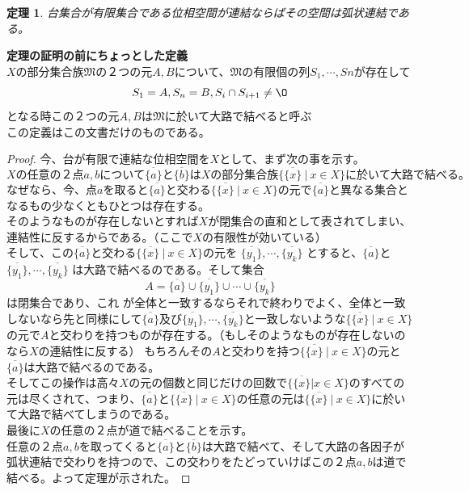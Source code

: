 \documentclass[leqno]{jsarticle}
\newtheorem{thm}{定理}
\begin{document}
\begin{thm}
台集合が有限集合である位相空間が連結ならばその空間は弧状連結である。
\end{thm}
{\bf 定理の証明の前にちょっとした定義}\\
$X$の部分集合族$\mathfrak{M}$の２つの元$A,B$について、$\mathfrak{M}$の有限個の列$S_{1},\cdots,S{n}$が存在して\[S_{1}=A,S_{n}=B,S_{i}\cap S_{i+1}\neq\O\]となる時この２つの元$A,B$は$\mathfrak{M}$に於いて大路で結べると呼ぶ\\
この定義はこの文書だけのものである。
\begin{proof}
今、台が有限で連結な位相空間を$X$として、まず次の事を示す。
\[
Xの任意の２点a,bについて\overline{\{a\}}と\overline{\{b\}}はXの部分集合族
\{\overline{\{x\}}\ |\ x\in{X}\}に於いて大路で結べる。
\]
なぜなら、今、点$a$を取ると$\overline{\{a\}}$と交わる$\{\overline{\{x\}}\ |\ x\in{X}\}$の元で$\overline{\{a\}}$と異なる集合となるもの少なくともひとつは存在する。\\
そのようなものが存在しないとすれば$X$が閉集合の直和として表されてしまい、連結性に反するからである。（ここで$X$の有限性が効いている）\\
そして、この$\overline{\{a\}}$と交わる$\{\overline{\{x\}}\ |\ x\in{X}\}$の元を
$\overline{\{y_{1}\}},\cdots,\overline{\{y_{k}\}}$
とすると、$\overline{\{a\}}$と
$\overline{\{y_{1}\}},\cdots,\overline{\{y_{k}\}}$
は大路で結べるのである。そして集合
\[
A=\overline{\{a\}}\cup\overline{\{y_{1}\}}\cup\cdots\cup\overline{\{y_{k}\}}
\]
は閉集合であり、これ
が全体と一致するならそれで終わりでよく、全体と一致しないなら先と同様にして$\overline{\{a\}}$及び$\overline{\{y_{1}\}},\cdots,\overline{\{y_{k}\}}$と一致しないような$\{\overline{\{x\}}\ |\ x\in{X}\}$の元で$A$と交わりを持つものが存在する。（もしそのようなものが存在しないのなら$X$の連結性に反する）
もちろんその$A$と交わりを持つ$\{\overline{\{x\}}\ |\ x\in{X}\}$の元と$\overline{\{a\}}$は大路で結べるのである。\\
そしてこの操作は高々$X$の元の個数と同じだけの回数で$\{\overline{\{x\}}|x\in{X}\}$のすべての元は尽くされて、つまり、$\overline{\{a\}}$と$\{\overline{\{x\}}\ |\ x\in{X}\}$の任意の元は$\{\overline{\{x\}}\ |\ x\in{X}\}$に於いて大路で結べてしまうのである。\\
最後に$X$の任意の２点が道で結べることを示す。\\任意の２点$a,b$を取ってくると$\overline{\{a\}}$と$\overline{\{b\}}$は大路で結べて、そして大路の各因子が弧状連結で交わりを持つので、この交わりをたどっていけばこの２点$a,b$は道で結べる。よって定理が示された。
\end{proof}
















			
\end{document}
